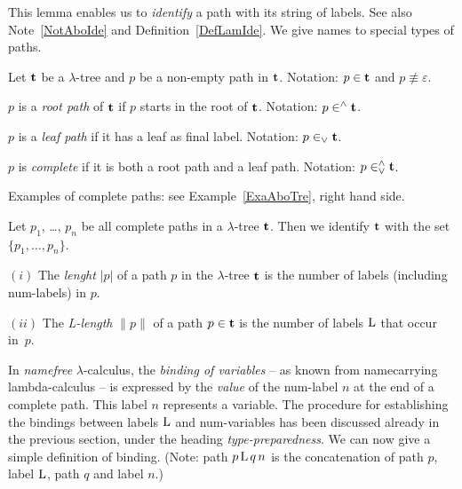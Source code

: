 \documentclass[submission,copyright,creativecommons]{eptcs}
\begin{document}
\smallskip

This lemma enables us to {\em identify\/} a path with its string of labels. See also Note~\ref{NotAboIde} and Definition~\ref{DefLamIde}. We give names to special types of paths.







\begin{Def}\label{DefLamPat}


Let ${\bf t}$ be a $\lambda$-tree and $p$ be a non-empty path in ${\bf t}$.
Notation: $p \in {\bf t}$ and $p \not \equiv \varepsilon$.

$p$ is a {\em root path\/} of ${\bf t}$ if $p$ starts in the root of ${\bf t}$. Notation: $p \in^{\wedge} {\bf t}$.

$p$ is a {\em leaf path\/} if it has a leaf as final label. Notation: $p \in_{\vee} {\bf t}$.

$p$ is {\em complete\/} if it is both a root path and a leaf path. Notation: $p \in^{\wedge}_{\vee} {\bf t}$.
\end{Def}

Examples of complete paths: see Example~\ref{ExaAboTre}, right hand side.



\begin{Def}\label{DefLamIde}
Let $p_1$, \ldots, $p_n$ be all complete paths in a $\lambda$-tree ${\bf t}$. Then we  identify ${\bf t}$ with the set $\{p_1, \ldots, p_n\}$.
\end{Def}

\begin{Def}\label{DefLamLen}
$(i)$ The {\em lenght\/} $| p |$ of a path $p$ in the $\lambda$-tree ${\bf t}$ is the number of labels (including num-labels) in $p$.

$(ii)$ The {\em {\rm L}-length\/} $\lVert p \lVert$ of a path $p \in {\bf t}$ is the number of labels ${\rm L}$ that occur in~$p$.
\end{Def}

\smallskip

In {\it namefree\/} $\lambda$-calculus, the {\em binding of variables\/} -- as known from namecarrying lambda-calculus -- is expressed by the {\em value\/} of the num-label $n$ at the end of a complete path. This label $n$ represents a variable. The procedure for establishing the bindings between labels ${\rm L}$ and num-variables  has been discussed already in the previous section, under the heading {\em type-preparedness\/}. We can now give a simple definition of binding. (Note: path $p \, {\rm L} \, q \, n$ is the concatenation of path $p$, label ${\rm L}$, path $q$ and label $n$.)
\end{document}
